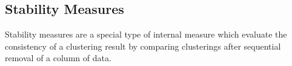 \subsection{Stability Measures}
Stability  measures  are a  special  type  of  internal measure  which
evaluate  the   consistency  of  a  clustering   result  by  comparing
clusterings after sequential removal of a column of data.












